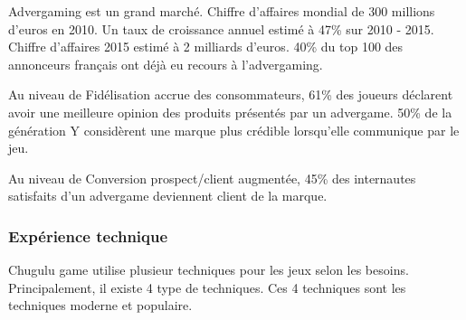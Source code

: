 Advergaming est un grand marché. Chiffre d’affaires mondial de 300 millions d’euros en 2010. Un taux de croissance annuel estimé à 47\% sur 2010 - 2015. Chiffre d’affaires 2015 estimé à 2 milliards d’euros. 40\% du top 100 des annonceurs français ont déjà eu recours à l’advergaming.



Au niveau de Fidélisation accrue des consommateurs, 61\% des joueurs déclarent avoir une meilleure opinion des produits présentés par un advergame. 50\% de la génération Y considèrent une marque plus crédible lorsqu'elle communique par le jeu.

Au niveau de Conversion prospect/client augmentée, 45\% des internautes satisfaits d’un advergame deviennent client de la marque.




\subsubsection{Expérience technique} %
\label{ssub:expérience_technique}

Chugulu game utilise plusieur techniques pour les jeux selon les besoins. Principalement, il existe 4 type de techniques. Ces 4 techniques sont les techniques moderne et populaire. 

